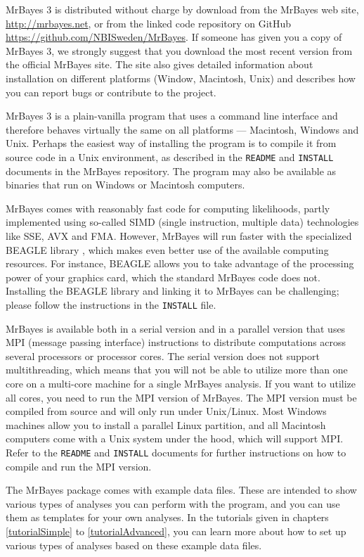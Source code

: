\documentclass[12pt]{book}
\newcommand{\ttt}[1]{\texttt{#1}}
\begin{document}
MrBayes 3 is distributed without charge by download from the MrBayes web site,
\url{http://mrbayes.net}, or from the linked code repository on GitHub
\url{https://github.com/NBISweden/MrBayes}. If someone has given you a copy of MrBayes 3, we
strongly suggest that you download the most recent version from the official MrBayes site. The site
also gives detailed information about installation on different platforms (Window, Macintosh, Unix)
and describes how you can report bugs or contribute to the project.

MrBayes 3 is a plain-vanilla program that uses a command line interface and therefore behaves
virtually the same on all platforms --- Macintosh, Windows and Unix. Perhaps the easiest way of
installing the program is to compile it from source code in a Unix environment, as described in the
\ttt{README} and \ttt{INSTALL} documents in the MrBayes repository. The program may also be
available as binaries that run on Windows or Macintosh computers.

MrBayes comes with reasonably fast code for computing likelihoods, partly implemented using
so-called SIMD (single instruction, multiple data) technologies like SSE, AVX and FMA. However,
MrBayes will run faster with the specialized BEAGLE library \citep{ayres12}, which makes even
better use of the available computing resources. For instance, BEAGLE allows you to take advantage
of the processing power of your graphics card, which the standard MrBayes code does not. Installing
the BEAGLE library and linking it to MrBayes can be challenging; please follow the instructions in
the \ttt{INSTALL} file.

MrBayes is available both in a serial version and in a parallel version that uses MPI (message
passing interface) instructions to distribute computations across several processors or processor
cores. The serial version does not support multithreading, which means that you will not be able to
utilize more than one core on a multi-core machine for a single MrBayes analysis. If you want to
utilize all cores, you need to run the MPI version of MrBayes. The MPI version must be compiled
from source and will only run under Unix/Linux. Most Windows machines allow you to install a
parallel Linux partition, and all Macintosh computers come with a Unix system under the hood, which
will support MPI. Refer to the \ttt{README} and \ttt{INSTALL} documents for further instructions on
how to compile and run the MPI version.

The MrBayes package comes with example data files. These are intended to show various types of
analyses you can perform with the program, and you can use them as templates for your own analyses.
In the tutorials given in chapters \ref{tutorialSimple} to \ref{tutorialAdvanced}, you can learn
more about how to set up various types of analyses based on these example data files.
\end{document}
